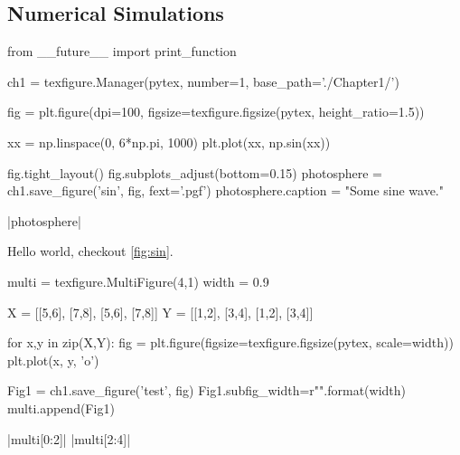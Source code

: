 \subsection{Numerical Simulations}
































\begin{pycode}[chapter1]
from __future__ import print_function

ch1 = texfigure.Manager(pytex, number=1, base_path='./Chapter1/')
\end{pycode}

\begin{pycode}[chapter1]
fig = plt.figure(dpi=100, figsize=texfigure.figsize(pytex, height_ratio=1.5))

xx = np.linspace(0, 6*np.pi, 1000)
plt.plot(xx, np.sin(xx))

fig.tight_layout()
fig.subplots_adjust(bottom=0.15)
photosphere = ch1.save_figure('sin', fig, fext='.pgf')
photosphere.caption = "Some sine wave."
\end{pycode}

\py[chapter1]|photosphere|



Hello world, checkout \cref{fig:sin}.


\begin{pycode}[chapter1]
	
multi = texfigure.MultiFigure(4,1)
width = 0.9

X = [[5,6], [7,8], [5,6], [7,8]]
Y = [[1,2], [3,4], [1,2], [3,4]]

for x,y in zip(X,Y):
	fig = plt.figure(figsize=texfigure.figsize(pytex, scale=width))
	plt.plot(x, y, 'o')
	
	Fig1 = ch1.save_figure('test', fig)
	Fig1.subfig_width=r"{}\columnwidth".format(width)
	multi.append(Fig1)
\end{pycode}

\py[chapter1]|multi[0:2]|
\py[chapter1]|multi[2:4]|
